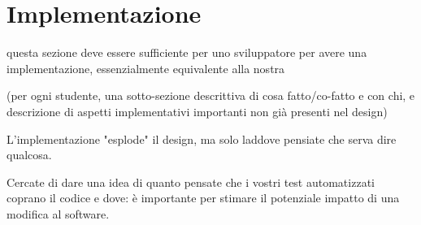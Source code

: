 \section{Implementazione}

questa sezione deve essere sufficiente per uno sviluppatore per avere una implementazione, essenzialmente equivalente alla nostra

(per ogni studente, una sotto-sezione descrittiva di cosa fatto/co-fatto e con chi, e descrizione di aspetti implementativi importanti non già presenti nel design)


L'implementazione "esplode" il design, ma solo laddove pensiate che serva dire qualcosa.

Cercate di dare una idea di quanto pensate che i vostri test automatizzati coprano il codice e dove: è importante per stimare il potenziale impatto di una modifica al software.
